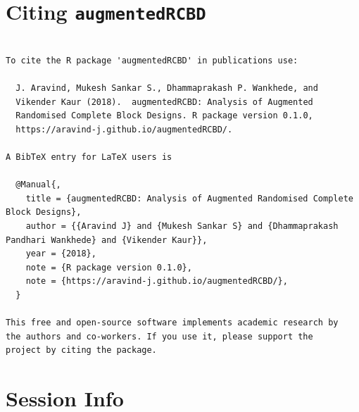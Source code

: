 \hypertarget{citing-augmentedrcbd}{%
\section{\texorpdfstring{Citing
\texttt{augmentedRCBD}}{Citing augmentedRCBD}}\label{citing-augmentedrcbd}}

\begin{verbatim}

To cite the R package 'augmentedRCBD' in publications use:

  J. Aravind, Mukesh Sankar S., Dhammaprakash P. Wankhede, and
  Vikender Kaur (2018).  augmentedRCBD: Analysis of Augmented
  Randomised Complete Block Designs. R package version 0.1.0,
  https://aravind-j.github.io/augmentedRCBD/.

A BibTeX entry for LaTeX users is

  @Manual{,
    title = {augmentedRCBD: Analysis of Augmented Randomised Complete Block Designs},
    author = {{Aravind J} and {Mukesh Sankar S} and {Dhammaprakash Pandhari Wankhede} and {Vikender Kaur}},
    year = {2018},
    note = {R package version 0.1.0},
    note = {https://aravind-j.github.io/augmentedRCBD/},
  }

This free and open-source software implements academic research by
the authors and co-workers. If you use it, please support the
project by citing the package.
\end{verbatim}

\hypertarget{session-info}{%
\section{Session Info}\label{session-info}}

\begin{Shaded}
\begin{Highlighting}[]
\NormalTok{()}
\end{Highlighting}
\end{Shaded}

